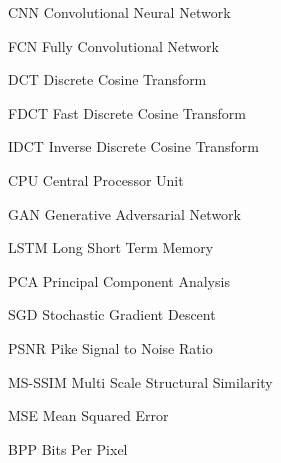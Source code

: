 \begin{denotation}
    \item[CNN] Convolutional Neural Network
    \item[FCN] Fully Convolutional Network
    \item[DCT] Discrete Cosine Transform
    \item[FDCT] Fast Discrete Cosine Transform
    \item[IDCT] Inverse Discrete Cosine Transform
    \item[CPU] Central Processor Unit
    \item[GAN] Generative Adversarial Network
    \item[LSTM] Long Short Term Memory
    \item[PCA] Principal Component Analysis
    \item[SGD] Stochastic Gradient Descent
    \item[PSNR] Pike Signal to Noise Ratio
    \item[MS-SSIM] Multi Scale Structural Similarity
    \item[MSE] Mean Squared Error
    \item[BPP] Bits Per Pixel
\end{denotation}

